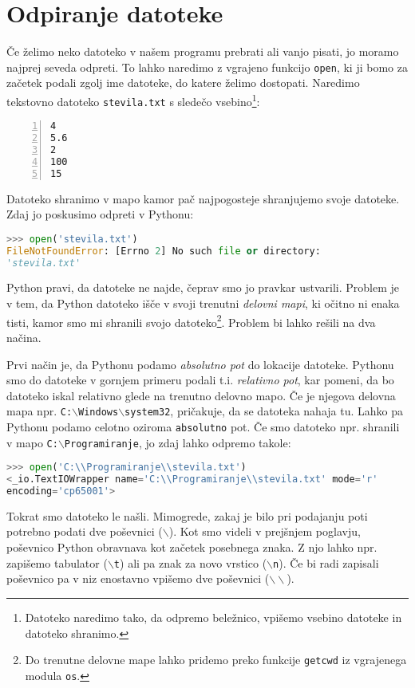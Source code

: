 \section{Odpiranje datoteke}

Če želimo neko datoteko v našem programu prebrati ali vanjo pisati, jo moramo najprej seveda odpreti. To lahko naredimo z vgrajeno funkcijo \texttt{open}, ki ji bomo za začetek podali zgolj ime datoteke, do katere želimo dostopati. Naredimo tekstovno datoteko \texttt{stevila.txt} s sledečo vsebino\footnote{Datoteko naredimo tako, da odpremo beležnico, vpišemo vsebino datoteke in datoteko shranimo.}:
\begin{lstlisting}[showstringspaces=false,numbers=left]
4
5.6
2
100
15
\end{lstlisting}
Datoteko shranimo v mapo kamor pač najpogosteje shranjujemo svoje datoteke. Zdaj jo poskusimo odpreti v Pythonu:
\begin{lstlisting}[language=Python, showstringspaces=false]
>>> open('stevila.txt')
FileNotFoundError: [Errno 2] No such file or directory: 
'stevila.txt'
\end{lstlisting}
Python pravi, da datoteke ne najde, čeprav smo jo pravkar ustvarili. Problem je v tem, da Python datoteko išče v svoji trenutni \emph{delovni mapi}, ki očitno ni enaka tisti, kamor smo mi shranili svojo datoteko\footnote{Do trenutne delovne mape lahko pridemo preko funkcije \texttt{getcwd} iz vgrajenega modula \texttt{os}.}. Problem bi lahko rešili na dva načina.

Prvi način je, da Pythonu podamo \emph{absolutno pot} do lokacije datoteke. Pythonu smo do datoteke v gornjem primeru podali t.i. \emph{relativno pot}, kar pomeni, da bo datoteko iskal relativno glede na trenutno delovno mapo. Če je njegova delovna mapa npr. \texttt{C:$\backslash$Windows$\backslash$system32}, pričakuje, da se datoteka nahaja tu. Lahko pa Pythonu podamo celotno oziroma \texttt{absolutno} pot. Če smo datoteko npr. shranili v mapo \texttt{C:$\backslash$Programiranje}, jo zdaj lahko odpremo takole:
\begin{lstlisting}[language=Python, showstringspaces=false]
>>> open('C:\\Programiranje\\stevila.txt')
<_io.TextIOWrapper name='C:\\Programiranje\\stevila.txt' mode='r'
encoding='cp65001'>
\end{lstlisting}
Tokrat smo datoteko le našli. Mimogrede, zakaj je bilo pri podajanju poti potrebno podati dve poševnici (\texttt{$\backslash$}). Kot smo videli v prejšnjem poglavju, poševnico Python obravnava kot začetek posebnega znaka. Z njo lahko npr. zapišemo tabulator (\texttt{$\backslash$t}) ali pa znak za novo vrstico (\texttt{$\backslash$n}). Če bi radi zapisali poševnico pa v niz enostavno vpišemo dve poševnici (\texttt{$\backslash\backslash$}).

